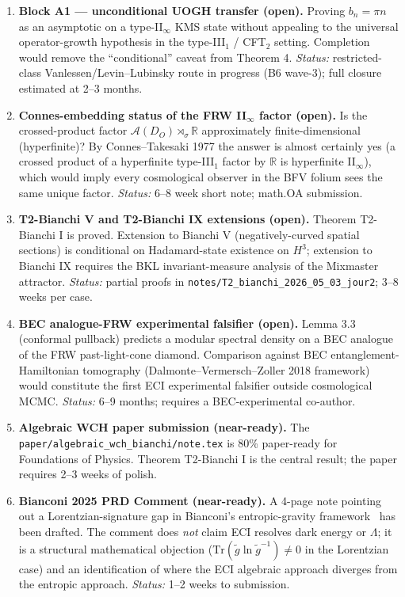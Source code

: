 \begin{enumerate}

\item \textbf{Block A1 — unconditional UOGH transfer (open).}
  Proving $b_n = \pi n$ as an asymptotic on a type-II$_\infty$ KMS state
  without appealing to the universal operator-growth hypothesis in the
  type-III$_1$ / CFT$_2$ setting.  Completion would remove the ``conditional''
  caveat from Theorem 4.
  \emph{Status:} restricted-class Vanlessen/Levin--Lubinsky route in progress
  (B6 wave-3); full closure estimated at 2--3 months.

\item \textbf{Connes-embedding status of the FRW II$_\infty$ factor (open).}
  Is the crossed-product factor $\mathcal{A}(D_O) \rtimes_\sigma \mathbb{R}$
  approximately finite-dimensional (hyperfinite)?
  By Connes--Takesaki 1977 the answer is almost certainly yes (a crossed
  product of a hyperfinite type-III$_1$ factor by $\mathbb{R}$ is hyperfinite
  II$_\infty$), which would imply every cosmological observer in the BFV
  folium sees the same unique factor.
  \emph{Status:} 6--8 week short note; math.OA submission.

\item \textbf{T2-Bianchi V and T2-Bianchi IX extensions (open).}
  Theorem T2-Bianchi I is proved.  Extension to Bianchi V (negatively-curved
  spatial sections) is conditional on Hadamard-state existence on $H^3$;
  extension to Bianchi IX requires the BKL invariant-measure analysis of the
  Mixmaster attractor.
  \emph{Status:} partial proofs in \texttt{notes/T2\_bianchi\_2026\_05\_03\_jour2};
  3--8 weeks per case.

\item \textbf{BEC analogue-FRW experimental falsifier (open).}
  Lemma 3.3 (conformal pullback) predicts a modular spectral density on a
  BEC analogue of the FRW past-light-cone diamond.  Comparison against
  BEC entanglement-Hamiltonian tomography (Dalmonte--Vermersch--Zoller 2018
  framework) would constitute the first ECI experimental falsifier outside
  cosmological MCMC.
  \emph{Status:} 6--9 months; requires a BEC-experimental co-author.

\item \textbf{Algebraic WCH paper submission (near-ready).}
  The \texttt{paper/algebraic\_wch\_bianchi/note.tex} is 80\% paper-ready
  for Foundations of Physics.  Theorem T2-Bianchi I is the central result;
  the paper requires 2--3 weeks of polish.

\item \textbf{Bianconi 2025 PRD Comment (near-ready).}
  A 4-page note pointing out a Lorentzian-signature gap in Bianconi's
  entropic-gravity framework~\cite{Bianconi2025} has been drafted.
  The comment does \emph{not} claim ECI resolves dark energy or $\Lambda$;
  it is a structural mathematical objection
  ($\mathrm{Tr}(\tilde{g}\ln\tilde{g}^{-1}) \neq 0$ in the Lorentzian case)
  and an identification of where the ECI algebraic approach diverges from
  the entropic approach.
  \emph{Status:} 1--2 weeks to submission.

\end{enumerate}

